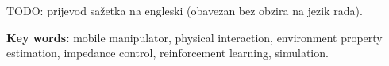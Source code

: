 
TODO: prijevod sažetka na engleski (obavezan bez obzira na jezik rada).

\vspace{8mm}
\noindent\textbf{Key words:} mobile manipulator, physical interaction, environment property
estimation, impedance control, reinforcement learning, simulation.
\clearpage
